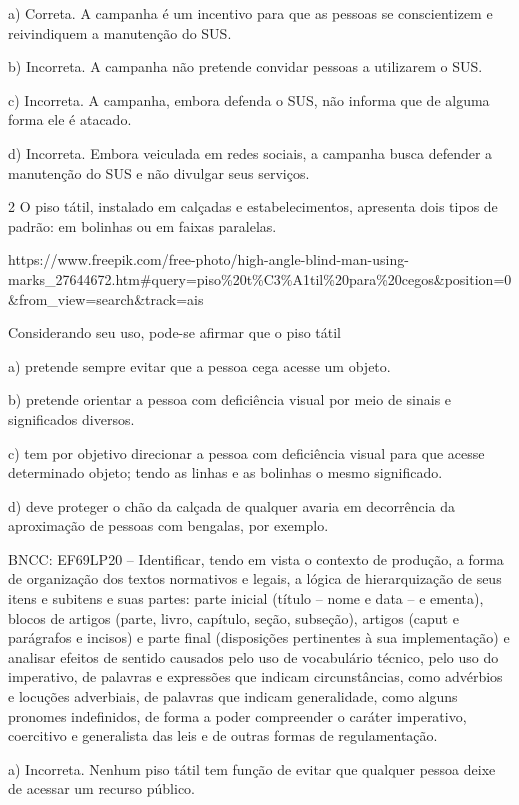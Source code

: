 a) Correta. A campanha é um incentivo para que as pessoas se
conscientizem e reivindiquem a manutenção do SUS.

b) Incorreta. A campanha não pretende convidar pessoas a utilizarem o
SUS.

c) Incorreta. A campanha, embora defenda o SUS, não informa que de
alguma forma ele é atacado.

d) Incorreta. Embora veiculada em redes sociais, a campanha busca
defender a manutenção do SUS e não divulgar seus serviços.

\num{2} O piso tátil, instalado em calçadas e estabelecimentos,
apresenta dois tipos de padrão: em bolinhas ou em faixas paralelas.

https://www.freepik.com/free-photo/high-angle-blind-man-using-marks\_27644672.htm\#query=piso\%20t\%C3\%A1til\%20para\%20cegos\&position=0\&from\_view=search\&track=ais

Considerando seu uso, pode-se afirmar que o piso tátil

a) pretende sempre evitar que a pessoa cega acesse um objeto.

b) pretende orientar a pessoa com deficiência visual por meio de sinais
e significados diversos.

c) tem por objetivo direcionar a pessoa com deficiência visual para que
acesse determinado objeto; tendo as linhas e as bolinhas o mesmo
significado.

d) deve proteger o chão da calçada de qualquer avaria em decorrência da
aproximação de pessoas com bengalas, por exemplo.

BNCC: EF69LP20 -- Identificar, tendo em vista o contexto de produção, a
forma de organização dos textos normativos e legais, a lógica de
hierarquização de seus itens e subitens e suas partes: parte inicial
(título -- nome e data -- e ementa), blocos de artigos (parte, livro,
capítulo, seção, subseção), artigos (caput e parágrafos e incisos) e
parte final (disposições pertinentes à sua implementação) e analisar
efeitos de sentido causados pelo uso de vocabulário técnico, pelo uso do
imperativo, de palavras e expressões que indicam circunstâncias, como
advérbios e locuções adverbiais, de palavras que indicam generalidade,
como alguns pronomes indefinidos, de forma a poder compreender o caráter
imperativo, coercitivo e generalista das leis e de outras formas de
regulamentação.

a) Incorreta. Nenhum piso tátil tem função de evitar que qualquer pessoa
deixe de acessar um recurso público.

